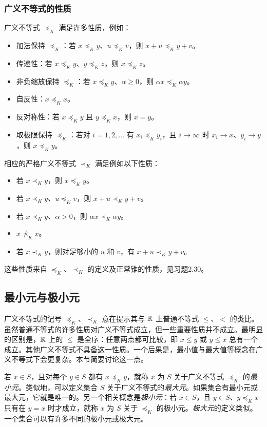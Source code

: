\subsubsection*{广义不等式的性质}
广义不等式 $\preceq_K$ 满足许多性质，例如：
\begin{itemize}
\item 加法保持 $\preceq_K$：若 $x\preceq_K y$、$u\preceq_K v$，则 $x+u\preceq_K y+v$。
\item 传递性：若 $x\preceq_K y$、$y\preceq_K z$，则 $x\preceq_K z$。
\item 非负缩放保持 $\preceq_K$：若 $x\preceq_K y$、$\alpha\ge0$，则 $\alpha x\preceq_K\alpha y$。
\item 自反性：$x\preceq_K x$。
\item 反对称性：若 $x\preceq_K y$ 且 $y\preceq_K x$，则 $x=y$。
\item 取极限保持 $\preceq_K$：若对 $i=1,2,\ldots$ 有 $x_i\preceq_K y_i$，且 $i\to\infty$ 时 $x_i\to x$、$y_i\to y$，则 $x\preceq_K y$。
\end{itemize}
相应的严格广义不等式 $\prec_K$ 满足例如以下性质：
\begin{itemize}
\item 若 $x\prec_K y$，则 $x\preceq_K y$。
\item 若 $x\prec_K y$、$u\preceq_K v$，则 $x+u\prec_K y+v$。
\item 若 $x\prec_K y$、$\alpha>0$，则 $\alpha x\prec_K\alpha y$。
\item $x\not\prec_K x$。
\item 若 $x\prec_K y$，则对足够小的 $u$ 和 $v$，有 $x+u\prec_K y+v$。
\end{itemize}
这些性质来自 $\preceq_K$、$\prec_K$ 的定义及正常锥的性质，见习题2.30。

\subsection{最小元与极小元}
广义不等式的记号 $\preceq_K$、$\prec_K$ 意在提示其与 $\mathbb R$ 上普通不等式 $\le$、$<$ 的类比。虽然普通不等式的许多性质对广义不等式成立，但一些重要性质并不成立。最明显的区别是，$\mathbb R$ 上的 $\le$ 是全序：任意两点都可比较，即 $x\le y$ 或 $y\le x$ 总有一个成立。其他广义不等式不具备这一性质。一个后果是，最小值与最大值等概念在广义不等式下会更复杂。本节简要讨论这一点。

若 $x\in S$，且对每个 $y\in S$ 都有 $x\preceq_K y$，就称 $x$ 为 $S$ 关于广义不等式 $\preceq_K$ 的\emph{最小元}。类似地，可以定义集合 $S$ 关于广义不等式的\emph{最大元}。如果集合有最小元或最大元，它就是唯一的。另一个相关概念是\emph{极小元}：若 $x\in S$，且 $y\in S$、$y\preceq_K x$ 只有在 $y=x$ 时才成立，就称 $x$ 为 $S$ 关于 $\preceq_K$ 的极小元。\emph{极大元}的定义类似。一个集合可以有许多不同的极小元或极大元。

